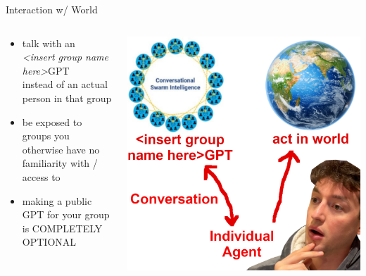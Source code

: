 \documentclass[aspectratio=169]{beamer}
\begin{document}
\begin{frame}{Interaction w/ World}
\begin{columns}[T]
    \begin{column}[T]{0.5\textwidth}
        \begin{itemize}
            \item talk with an\\ \textit{<insert group name here>}GPT\\ instead of an actual person in that group
            \item be exposed to groups you otherwise have no familiarity with / access to
            \item making a public GPT for your group is COMPLETELY OPTIONAL
        \end{itemize}
    \end{column}
    \begin{column}{0.5\textwidth}
        \includegraphics[height=0.8\textheight]{imgs/CSI_section/agency.png}
    \end{column}
\end{columns}
\end{frame}
\end{document}
